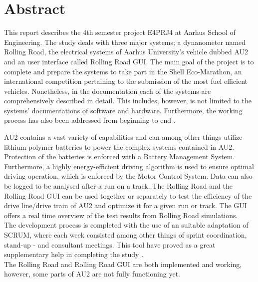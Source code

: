\chapter{Abstract}

This report describes the 4th semester project E4PRJ4 at Aarhus School of Engineering. The study deals with three major systems; a dynanometer named Rolling Road, the electrical systems of Aarhus University's vehicle dubbed AU2 and an user interface called Rolling Road GUI. The main goal of the project is to complete and prepare the systems to take part in the Shell Eco-Marathon, an international competition pertaining to the submission of the most fuel efficient vehicles. Nonetheless, in the documentation each of the systems are comprehensively described in detail. This includes, however, is not limited to the systems' documentations of software and hardware. Furthermore, the working process has also been addressed from beginning to end . 

AU2 contains a vast variety of capabilities and can among other things utilize lithium polymer batteries to power the complex systems contained in AU2.
Protection of the batteries is enforced with a Battery Management System. Furthermore, a highly energy-efficient driving algorithm is used to ensure optimal driving operation, which is enforced by the Motor Control System. Data can also be logged to be analysed after a run on a track.
The Rolling Road and the Rolling Road GUI can be used together or separately to test the efficiency of the drive line/drive train of AU2 and optimize it for a given run or track. The GUI offers a real time overview of the test results from Rolling Road simulations.\\

The development process is completed with the use of an suitable adaptation of SCRUM, where each week consisted among other things of sprint coordination, stand-up - and consultant meetings. This tool have proved as a great
supplementary help in completing the study .\\
The Rolling Road and Rolling Road GUI are both implemented and working, however, some parts of AU2 are not fully functioning yet.